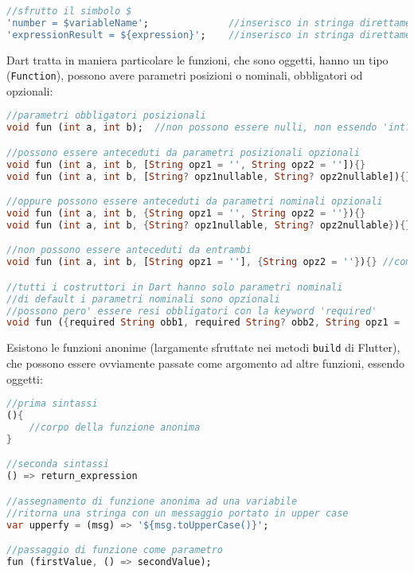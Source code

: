 \begin{lstlisting}[language=dart, firstnumber=1,caption={Dart interpolazone stringhe}]
//sfrutto il simbolo $
'number = $variableName';              //inserisco in stringa direttamente una variabile
'expressionResult = ${expression}';    //inserisco in stringa direttamente un'espressione
\end{lstlisting}

Dart tratta in maniera particolare le funzioni, che sono oggetti, hanno un tipo (\verb+Function+), possono avere parametri posizioni o nominali, obbligatori od opzionali: 

\begin{lstlisting}[language=dart, firstnumber=1,caption={Dart parametri funzioni}]
//parametri obbligatori posizionali
void fun (int a, int b);  //non possono essere nulli, non essendo 'int? a'

//possono essere anteceduti da parametri posizionali opzionali
void fun (int a, int b, [String opz1 = '', String opz2 = '']){}
void fun (int a, int b, [String? opz1nullable, String? opz2nullable]){}

//oppure possono essere anteceduti da parametri nominali opzionali
void fun (int a, int b, {String opz1 = '', String opz2 = ''}){}
void fun (int a, int b, {String? opz1nullable, String? opz2nullable}){}

//non possono essere anteceduti da entrambi
void fun (int a, int b, [String opz1 = ''], {String opz2 = ''}){} //compile error

//tutti i costruttori in Dart hanno solo parametri nominali
//di default i parametri nominali sono opzionali
//possono pero' essere resi obbligatori con la keyword 'required'
void fun ({required String obb1, required String? obb2, String opz1 = ''}){}
\end{lstlisting}

Esistono le funzioni anonime (largamente sfruttate nei metodi \verb+build+ di Flutter), che possono essere ovviamente passate come argomento ad altre funzioni, essendo oggetti:

\begin{lstlisting}[language=dart, firstnumber=1,caption={Dart funzioni anonime}]
//prima sintassi
(){
    //corpo della funzione anonima
} 

//seconda sintassi
() => return_expression

//assegnamento di funzione anonima ad una variabile
//ritorna una stringa con un messaggio portato in upper case
var upperfy = (msg) => '${msg.toUpperCase()}';

//passaggio di funzione come parametro
fun (firstValue, () => secondValue);
\end{lstlisting}

